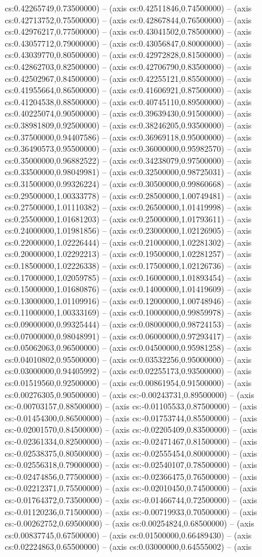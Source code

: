 cs:0.42265749,0.73500000) -- (axis cs:0.42511846,0.74500000) -- (axis cs:0.42713752,0.75500000) -- (axis cs:0.42867844,0.76500000) -- (axis cs:0.42976217,0.77500000) -- (axis cs:0.43041502,0.78500000) -- (axis cs:0.43057712,0.79000000) -- (axis cs:0.43056847,0.80000000) -- (axis cs:0.43039770,0.80500000) -- (axis cs:0.42972828,0.81500000) -- (axis cs:0.42862703,0.82500000) -- (axis cs:0.42706790,0.83500000) -- (axis cs:0.42502967,0.84500000) -- (axis cs:0.42255121,0.85500000) -- (axis cs:0.41955664,0.86500000) -- (axis cs:0.41606921,0.87500000) -- (axis cs:0.41204538,0.88500000) -- (axis cs:0.40745110,0.89500000) -- (axis cs:0.40225074,0.90500000) -- (axis cs:0.39639430,0.91500000) -- (axis cs:0.38981809,0.92500000) -- (axis cs:0.38246205,0.93500000) -- (axis cs:0.37500000,0.94407586) -- (axis cs:0.36969118,0.95000000) -- (axis cs:0.36490573,0.95500000) -- (axis cs:0.36000000,0.95982570) -- (axis cs:0.35000000,0.96882522) -- (axis cs:0.34238079,0.97500000) -- (axis cs:0.33500000,0.98049981) -- (axis cs:0.32500000,0.98725031) -- (axis cs:0.31500000,0.99326224) -- (axis cs:0.30500000,0.99860668) -- (axis cs:0.29500000,1.00333778) -- (axis cs:0.28500000,1.00749481) -- (axis cs:0.27500000,1.01110382) -- (axis cs:0.26500000,1.01419998) -- (axis cs:0.25500000,1.01681203) -- (axis cs:0.25000000,1.01793611) -- (axis cs:0.24000000,1.01981856) -- (axis cs:0.23000000,1.02126905) -- (axis cs:0.22000000,1.02226444) -- (axis cs:0.21000000,1.02281302) -- (axis cs:0.20000000,1.02292213) -- (axis cs:0.19500000,1.02281257) -- (axis cs:0.18500000,1.02226338) -- (axis cs:0.17500000,1.02126736) -- (axis cs:0.17000000,1.02059785) -- (axis cs:0.16000000,1.01893454) -- (axis cs:0.15000000,1.01680876) -- (axis cs:0.14000000,1.01419609) -- (axis cs:0.13000000,1.01109916) -- (axis cs:0.12000000,1.00748946) -- (axis cs:0.11000000,1.00333169) -- (axis cs:0.10000000,0.99859978) -- (axis cs:0.09000000,0.99325444) -- (axis cs:0.08000000,0.98724153) -- (axis cs:0.07000000,0.98048991) -- (axis cs:0.06000000,0.97293417) -- (axis cs:0.05062063,0.96500000) -- (axis cs:0.04500000,0.95981258) -- (axis cs:0.04010802,0.95500000) -- (axis cs:0.03532256,0.95000000) -- (axis cs:0.03000000,0.94405992) -- (axis cs:0.02255173,0.93500000) -- (axis cs:0.01519560,0.92500000) -- (axis cs:0.00861954,0.91500000) -- (axis cs:0.00276305,0.90500000) -- (axis cs:-0.00243731,0.89500000) -- (axis cs:-0.00703157,0.88500000) -- (axis cs:-0.01105533,0.87500000) -- (axis cs:-0.01454300,0.86500000) -- (axis cs:-0.01753744,0.85500000) -- (axis cs:-0.02001570,0.84500000) -- (axis cs:-0.02205409,0.83500000) -- (axis cs:-0.02361334,0.82500000) -- (axis cs:-0.02471467,0.81500000) -- (axis cs:-0.02538375,0.80500000) -- (axis cs:-0.02555454,0.80000000) -- (axis cs:-0.02556318,0.79000000) -- (axis cs:-0.02540107,0.78500000) -- (axis cs:-0.02474856,0.77500000) -- (axis cs:-0.02366475,0.76500000) -- (axis cs:-0.02212371,0.75500000) -- (axis cs:-0.02010450,0.74500000) -- (axis cs:-0.01764372,0.73500000) -- (axis cs:-0.01466744,0.72500000) -- (axis cs:-0.01120236,0.71500000) -- (axis cs:-0.00719933,0.70500000) -- (axis cs:-0.00262752,0.69500000) -- (axis cs:0.00254824,0.68500000) -- (axis cs:0.00837745,0.67500000) -- (axis cs:0.01500000,0.66489430) -- (axis cs:0.02224863,0.65500000) -- (axis cs:0.03000000,0.64555002) -- (axis 